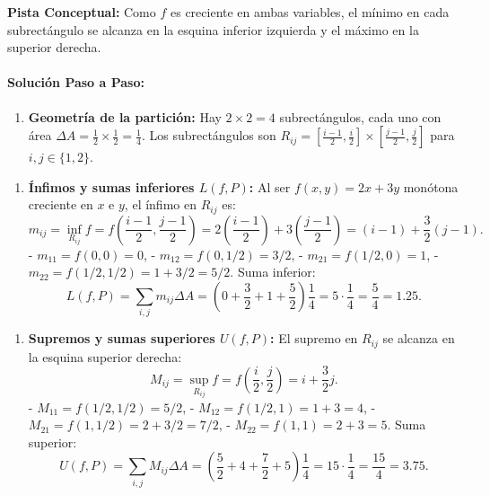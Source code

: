\documentclass[11pt,a4paper]{article}
\begin{document}
\begin{tcolorbox}[colback=yellow!4,colframe=accentamber!70,arc=1mm,boxrule=0.5pt,left=3mm,right=3mm,top=1.5mm,bottom=1.5mm]
\textbf{Pista Conceptual:} Como $f$ es creciente en ambas variables, el mínimo en cada subrectángulo se alcanza en la esquina inferior izquierda y el máximo en la superior derecha.
\end{tcolorbox}

\paragraph{Solución Paso a Paso:}\par
\begin{enumerate}[label=\textbf{\arabic*.}]
\item \textbf{Geometría de la partición:}
Hay $2 \times 2 = 4$ subrectángulos, cada uno con área $\Delta A = \frac{1}{2} \times \frac{1}{2} = \frac{1}{4}$.
Los subrectángulos son $R_{ij} = [\frac{i-1}{2}, \frac{i}{2}] \times [\frac{j-1}{2}, \frac{j}{2}]$ para $i, j \in \{1, 2\}$.
\end{enumerate}

\begin{enumerate}[label=\textbf{\arabic*.}]
\item \textbf{Ínfimos y sumas inferiores $L(f,P)$:}
Al ser $f(x,y) = 2x + 3y$ monótona creciente en $x$ e $y$, el ínfimo en $R_{ij}$ es:
\begin{equation*}
m_{ij} = \inf_{R_{ij}} f = f\left(\frac{i-1}{2}, \frac{j-1}{2}\right) = 2\left(\frac{i-1}{2}\right) + 3\left(\frac{j-1}{2}\right) = (i-1) + \frac{3}{2}(j-1).
\end{equation*}
- $m_{11} = f(0, 0) = 0$,
- $m_{12} = f(0, 1/2) = 3/2$,
- $m_{21} = f(1/2, 0) = 1$,
- $m_{22} = f(1/2, 1/2) = 1 + 3/2 = 5/2$.
Suma inferior:
\begin{equation*}
L(f,P) = \sum_{i,j} m_{ij} \Delta A = \left(0 + \frac{3}{2} + 1 + \frac{5}{2}\right) \frac{1}{4} = 5 \cdot \frac{1}{4} = \frac{5}{4} = 1.25.
\end{equation*}
\end{enumerate}

\begin{enumerate}[label=\textbf{\arabic*.}]
\item \textbf{Supremos y sumas superiores $U(f,P)$:}
El supremo en $R_{ij}$ se alcanza en la esquina superior derecha:
\begin{equation*}
M_{ij} = \sup_{R_{ij}} f = f\left(\frac{i}{2}, \frac{j}{2}\right) = i + \frac{3}{2}j.
\end{equation*}
- $M_{11} = f(1/2, 1/2) = 5/2$,
- $M_{12} = f(1/2, 1) = 1 + 3 = 4$,
- $M_{21} = f(1, 1/2) = 2 + 3/2 = 7/2$,
- $M_{22} = f(1, 1) = 2 + 3 = 5$.
Suma superior:
\begin{equation*}
U(f,P) = \sum_{i,j} M_{ij} \Delta A = \left(\frac{5}{2} + 4 + \frac{7}{2} + 5\right) \frac{1}{4} = 15 \cdot \frac{1}{4} = \frac{15}{4} = 3.75.
\end{equation*}
\end{enumerate}
\end{document}

